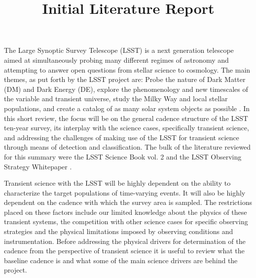 \documentclass[12pt]{article}
\title{Initial Literature Report}
\begin{document}
\par
\vspace{7pt}
The Large Synoptic Survey Telescope (LSST) is a next generation telescope aimed at simultaneously probing many different regimes of astronomy and attempting to answer open questions from stellar science to cosmology. The main themes, as put forth by the LSST project are: Probe the nature of Dark Matter (DM) and Dark Energy (DE), explore the phenomenology and new timescales of the variable and transient universe, study the Milky Way and local stellar populations, and create a catalog of as many solar system objects as possible \cite{LSSTScienceCollaboration2017}. In this short review, the focus will be on the general cadence structure of the LSST ten-year survey, its interplay with the science cases, specifically transient science, and addressing the challenges of making use of the LSST for transient science through means of detection and classification. The bulk of the literature reviewed for this summary were the LSST Science Book vol. 2 and the LSST Observing Strategy Whitepaper \citep{LSSTScienceCollaboration2009,LSSTScienceCollaboration2017}. \par
Transient science with the LSST will be highly dependent on the ability to characterize the target populations of time-varying events. It will also be highly dependent on the cadence with which the survey area is sampled. The restrictions placed on these factors include our limited knowledge about the physics of these transient systems, the competition with other science cases for specific observing strategies and the physical limitations imposed by observing conditions and instrumentation. Before addressing the physical drivers for determination of the cadence from the perspective of transient science it is useful to review what the baseline cadence is and what some of the main science drivers are behind the project. \par
\end{document}
